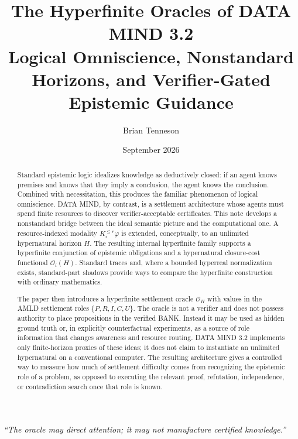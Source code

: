 \documentclass[11pt]{article}
\title{\textbf{The Hyperfinite Oracles of DATA MIND 3.2}\\[0.35em]
\large Logical Omniscience, Nonstandard Horizons, and Verifier-Gated Epistemic Guidance}
\author{Brian Tenneson}
\date{September 2026}
\newcommand{\Ocal}{\mathcal{O}}
\begin{document}
\maketitle

\begin{center}
\begin{minipage}{0.84\textwidth}
\centering\itshape
``The oracle may direct attention; it may not manufacture certified knowledge.''
\end{minipage}
\end{center}

\begin{abstract}
Standard epistemic logic idealizes knowledge as deductively closed: if an agent knows premises and knows that they imply a conclusion, the agent knows the conclusion. Combined with necessitation, this produces the familiar phenomenon of logical omniscience. DATA MIND, by contrast, is a settlement architecture whose agents must spend finite resources to discover verifier-acceptable certificates. This note develops a nonstandard bridge between the ideal semantic picture and the computational one. A resource-indexed modality $K_i^{\le r}\varphi$ is extended, conceptually, to an unlimited hypernatural horizon $H$. The resulting internal hyperfinite family supports a hyperfinite conjunction of epistemic obligations and a hypernatural closure-cost functional $\Ocal_i(H)$. Standard traces and, where a bounded hyperreal normalization exists, standard-part shadows provide ways to compare the hyperfinite construction with ordinary mathematics.

The paper then introduces a hyperfinite settlement oracle $\mathscr O_H$ with values in the AMLD settlement roles $\{P,R,I,C,U\}$. The oracle is not a verifier and does not possess authority to place propositions in the verified BANK. Instead it may be used as hidden ground truth or, in explicitly counterfactual experiments, as a source of role information that changes awareness and resource routing. DATA MIND 3.2 implements only finite-horizon proxies of these ideas; it does not claim to instantiate an unlimited hypernatural on a conventional computer. The resulting architecture gives a controlled way to measure how much of settlement difficulty comes from recognizing the epistemic role of a problem, as opposed to executing the relevant proof, refutation, independence, or contradiction search once that role is known.
\end{abstract}

\tableofcontents
\newpage
\end{document}

